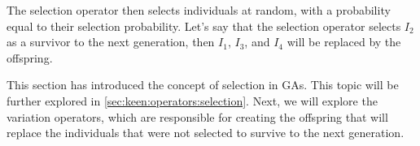   The selection operator then selects individuals at random, with a probability equal to their
  selection probability.
  Let's say that the selection operator selects \(I_2\) as a survivor to the next generation, then
  \(I_1\), \(I_3\), and \(I_4\) will be replaced by the offspring.

  This section has introduced the concept of selection in GAs.
  This topic will be further explored in \vref{sec:keen:operators:selection}.
  Next, we will explore the variation operators, which are responsible for creating the offspring
  that will replace the individuals that were not selected to survive to the next generation.
